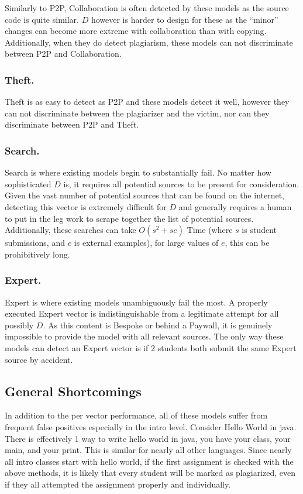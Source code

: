 \documentclass[10pt]{article}
\begin{document}
		Similarly to P2P, Collaboration is often detected by these models as the source code is quite similar.  $D$ however is harder to design for these as the ``minor'' changes can become more extreme with collaboration than with copying.  Additionally, when they do detect plagiarism, these models can not discriminate between P2P and Collaboration.
	\subsubsection{Theft.\hspace{0.5em}\phantom{}}
	
		Theft is as easy to detect as P2P and these models detect it well, however they can not discriminate between the plagiarizer and the victim, nor can they discriminate between P2P and Theft.
	\subsubsection{Search.\hspace{0.5em}\phantom{}}
	
		Search is where existing models begin to substantially fail.  No matter how sophisticated $D$ is, it requires all potential sources to be present for consideration.  Given the vast number of potential sources that can be found on the internet, detecting this vector is extremely difficult for $D$ and generally requires a human to put in the leg work to scrape together the list of potential sources.  Additionally, these searches can take $O(s^2+se)$ Time (where $s$ is student submissions, and $e$ is external examples), for large values of $e$, this can be prohibitively long.  
		
	\subsubsection{Expert.\hspace{0.5em}\phantom{}} 
	
	Expert is where existing models unambiguously fail the most.  A properly executed Expert vector is indistinguishable from a legitimate attempt for all possibly $D$.  As this content is Bespoke or behind a Paywall, it is genuinely impossible to provide the model with all relevant sources.  The only way these models can detect an Expert vector is if 2 students both submit the same Expert source by accident.
	
\subsection{General Shortcomings}
In addition to the per vector performance, all of these models suffer from frequent false positives especially in the intro level.  Consider Hello World in java.  There is effectively 1 way to write hello world in java, you have your class, your main, and your print.  This is similar for nearly all other languages.  Since nearly all intro classes start with hello world, if the first assignment is checked with the above methods, it is likely that every student will be marked as plagiarized, even if they all attempted the assignment properly and individually.
\end{document}
